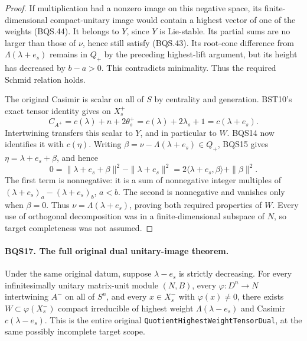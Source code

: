 \begin{proof}
If multiplication had a nonzero image on this negative space, its
finite-dimensional compact-unitary image would contain a highest
vector of one of the weights (BQS.44).
It belongs to $Y$, since $Y$ is Lie-stable.
Its partial sums are no larger than those of $\nu$, hence still
satisfy (BQS.43).  Its root-cone difference from
$\Lambda(\lambda+e_s)$ remains in $Q_+$ by the preceding highest-lift
argument, but its height has decreased by $b-a>0$.
This contradicts minimality.  Thus the required Schmid relation holds.

The original Casimir is scalar on all of $S$ by centrality and generation.
BST10's exact tensor identity gives on $X_s^+$
\[
 C_{A^+}=c(\lambda)+n+2\theta_s^+
         =c(\lambda)+2\lambda_s+1=c(\lambda+e_s).
 \tag{BQS.45}
\]
Intertwining transfers this scalar to $Y$, and in particular to $W$.
BQS14 now identifies it with $c(\eta)$.
Writing $\beta=\nu-\Lambda(\lambda+e_s)\in Q_+$, BQS15 gives
$\eta=\lambda+e_s+\beta$, and hence
\[
 0=\|\lambda+e_s+\beta\|^2-\|\lambda+e_s\|^2
   =2\langle\lambda+e_s,\beta\rangle+\|\beta\|^2.
 \tag{BQS.46}
\]
The first term is nonnegative: it is a sum of nonnegative integer
multiples of $(\lambda+e_s)_a-(\lambda+e_s)_b$, $a<b$.
The second is nonnegative and vanishes only when $\beta=0$.
Thus $\nu=\Lambda(\lambda+e_s)$, proving both required properties
of $W$.  Every use of orthogonal decomposition was in a finite-dimensional
subspace of $N$, so target completeness was not assumed.
\end{proof}

\paragraph{BQS17. The full original dual unitary-image theorem.}
\label{claim:BQS17}
Under the same original datum, suppose $\lambda-e_s$ is strictly
decreasing.  For every infinitesimally unitary matrix-unit module
$(N,B)$, every $\varphi:D^n\to N$ intertwining $A^-$ on all of $S^n$,
and every $x\in X_s^-$ with $\varphi(x)\ne0$, there exists
$W\subset\varphi(X_s^-)$ compact irreducible of highest weight
$\Lambda(\lambda-e_s)$ and Casimir $c(\lambda-e_s)$.
This is the entire original \texttt{QuotientHighestWeightTensorDual},
at the same possibly incomplete target scope.

